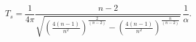 \begin{equation}
T_{s}=\frac{1}{4\pi}\frac{n-2}{\sqrt{\left ({\frac
{4(n-1)}{{n}^{2}}}\right )^\frac{2}{\left (n-2\right )}-\left ({\frac
{4(n-1)}{{n}^{2}}}\right )^\frac{n}{\left (n-2\right )}}}\,\frac{1}{\alpha}.
\end{equation}

